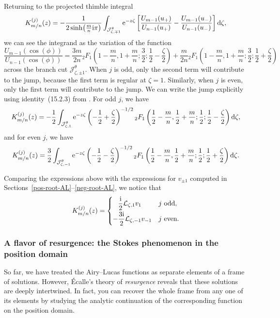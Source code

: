 \documentclass[10pt,a4paper]{amsart}
\newcommand{\laplace}{\mathcal{L}}
\numberwithin{equation}{section}
\begin{document}
Returning to the projected thimble integral
\[ K^{(j)}_{m/n}(z) = -\frac{1}{2\sinh\bigl(\frac{m}{n} {\rm i}\pi\bigr)} \int_{\mathcal{J}^\theta_{\zeta, \mp 1}} {\rm e}^{-z\zeta} \left[ \frac{U_{m-1}(u_+)}{U_{n-1}(u_+)} - \frac{U_{m-1}(u_-)}{U_{n-1}(u_-)} \right] {\rm d}\zeta, \]
we can see the integrand as the variation of the function
\[ \frac{U_{m-1}(\cos(\phi))}{U_{n-1}(\cos(\phi))} = \frac{3m}{2n} {}_2F_1\left(1 - \frac{m}{n}, 1 + \frac{m}{n}; \frac{3}{2};\frac{1}{2} - \frac{\zeta}{2}\right) + \frac{m}{2n} {}_2F_1\left(1 - \frac{m}{n}, 1 + \frac{m}{n}; \frac{3}{2}; \frac{1}{2} + \frac{\zeta}{2}\right) \]
across the branch cut $\mathcal{J}^\theta_{\zeta, \pm 1}$. When $j$ is odd, only the second term will contribute to the jump, because the first term is regular at $\zeta = 1$. Similarly, when $j$ is even, only the first term will contribute to the jump. We can write the jump explicitly using identity~(15.2.3) from \cite{dlmf}. For odd $j$, we have
\[ K^{(j)}_{m/n}(z) = -\frac{1}{2} \int_{\mathcal{J}^\theta_{\zeta, 1}} {\rm e}^{-z\zeta} \left(-\frac{1}{2}+\frac{\zeta}{2}\right)^{-1/2} {}_2F_1\left(\frac{1}{2} - \frac{m}{n}, \frac{1}{2} + \frac{m}{n}; \frac{1}{2}; \frac{1}{2} - \frac{\zeta}{2}\right) {\rm d}\zeta, \]
and for even $j$, we have
\[ K^{(j)}_{m/n}(z) = \frac{3}{2} \int_{\mathcal{J}^\theta_{\zeta, -1}} {\rm e}^{-z\zeta} \left(-\frac{1}{2}-\frac{\zeta}{2}\right)^{-1/2} {}_2F_1\left(\frac{1}{2} - \frac{m}{n}, \frac{1}{2} + \frac{m}{n}; \frac{1}{2}; \frac{1}{2} + \frac{\zeta}{2}\right) {\rm d}\zeta. \]

Comparing the expressions above with the expressions for $v_{\pm 1}$ computed in Sections~\ref{pos-root-AL}--\ref{neg-root-AL}, we notice that
\[ K^{(j)}_{m/n}(z) = \begin{cases}
\hphantom{-}\dfrac{\rm i}{2}\laplace_{\zeta, 1} v_1 & j \text{ odd}, \vspace{1mm}\\
-\dfrac{3{\rm i}}{2}\laplace_{\zeta, -1} v_{-1} & j \text{ even}.
\end{cases} \]

\subsubsection{A flavor of resurgence: the Stokes phenomenon in the position domain}\label{resurgence-AL}

So far, we have treated the Airy--Lucas functions as separate elements of a frame of solutions. However, \'{E}calle's theory of {\em resurgence} reveals that these solutions are deeply intertwined. In fact, you can recover the whole frame from any one of its elements by studying the analytic continuation of the corresponding function on the position domain.
\end{document}
